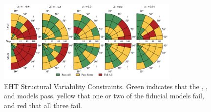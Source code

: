 \begin{figure}
  \centering
  \includegraphics[width=0.8\textwidth]{./figures/4Glam_Constraints.pdf}
  \caption{EHT Structural Variability Constraints.  Green indicates that the \kharma, \bhac, and \hamr models pass, yellow that one or two of the fiducial models fail, and red that all three fail.}
  \label{fig:ehtvar_pizza}
\end{figure}

\clearpage
